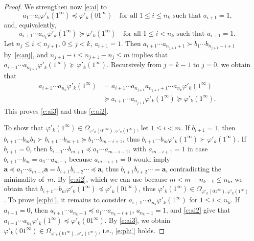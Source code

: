 \documentclass{amsart}
\theoremstyle{definition}
\numberwithin{equation}{section}
\newcommand{\ba}{\mathbf{a}}
\begin{document}
\begin{proof}
We strengthen now \eqref{e:ai} to 
\begin{equation} \label{e:ai2}
a_1 \cdots a_i \varphi'_k(1^\infty) \preceq \varphi'_k(01^\infty) \quad \mbox{for all $1 \le i \le n_k$ such that $a_{i+1} = 1$,}
\end{equation}
and, equivalently, 
\begin{equation} \label{e:ai3}
a_{i+1} \cdots a_{n_k} \varphi'_k(1^\infty) \succeq \varphi'_k(1^\infty) \quad \mbox{for all $1 \le i < n_k$ such that $a_{i+1} = 1$.}
\end{equation}
Let $n_j \le i < n_{j+1}$, $0 \le j < k$, $a_{i+1} = 1$.
Then $a_{i+1} \cdots a_{n_{j+1}+1} \succ b_1 \cdots b_{n_{j+1}-i+1}$ by~\eqref{e:anj}, and $n_{j+1}{-}i \le n_{j+1}{-}n_j \le m$ implies that $a_{i+1} \cdots a_{n_{j+1}} \varphi'_k(1^\infty) \succeq \varphi'_k(1^\infty)$.
Recursively from $j = k{-}1$ to $j = 0$, we obtain that
\[
\begin{aligned}
a_{i+1} \cdots a_{n_k} \varphi'_k(1^\infty) & = a_{i+1} \cdots a_{n_{j+1}} a_{n_{j+1}+1} \cdots a_{n_k} \varphi'_k(1^\infty) \\
& \succeq a_{i+1} \cdots a_{n_{j+1}} \varphi'_k(1^\infty) \succeq \varphi'_k(1^\infty).
\end{aligned}
\]
This proves \eqref{e:ai3} and thus \eqref{e:ai2}.

To show that $\varphi'_k(1^\infty) \in \Omega_{\varphi'_k(01^\infty),\varphi'_k(1^\infty)}$, let $1 \le i < m$.
If $b_{i+1} = 1$, then $b_{i+1} \cdots b_m b_1 \succ b_{i+1} \cdots b_{m+1} \succeq b_1 \cdots b_{m-i+1}$, thus $b_{i+1} \cdots b_m \varphi'_k(1^\infty) \succ \varphi'_k(1^\infty)$.
If $b_{i+1} = 0$, then $b_{i+1} \cdots b_{m+1} \preceq a_1 \cdots a_{m-i+1}$, with $a_{m-i+1} = 1$ in case $b_{i+1} \cdots b_m = a_1 \cdots a_{m-i}$ because $a_{m-i+1} = 0$ would imply $\ba \preceq a_1 \cdots a_{m-i} \ba = b_{i+1} b_{i+2} \cdots \preceq \ba$, thus $b_{i+1} b_{i+2} \cdots = \ba$, contradicting the minimality of~$m$.
By \eqref{e:ai2}, which we can use because $m < m{+}n_{k-1} \le n_k$, we obtain that $b_{i+1} \cdots b_m \varphi'_k(1^\infty) \preceq \varphi'_k(01^\infty)$, thus $\varphi'_k(1^\infty) \in \Omega_{\varphi'_k(01^\infty),\varphi'_k(1^\infty)}$.
To prove \eqref{e:phi'}, it remains to consider $a_{i+1} \cdots a_{n_k} \varphi'_k(1^\infty)$ for $1 \le i < n_k$.
If $a_{i+1} = 0$, then $a_{i+1} \cdots a_{n_k+1} \preceq a_1 \cdots a_{n_k-i+1}$,  
$a_{n_k+1} = 1$, and \eqref{e:ai2} give that $a_{i+1} \cdots a_{n_k} \varphi'_k(1^\infty) \preceq \varphi'_k(01^\infty)$.
By \eqref{e:ai3}, we obtain $\varphi'_k(01^\infty) \in \Omega_{\varphi'_k(01^\infty),\varphi'_k(1^\infty)}$, i.e., \eqref{e:phi'} holds.


\end{proof}
\end{document}
